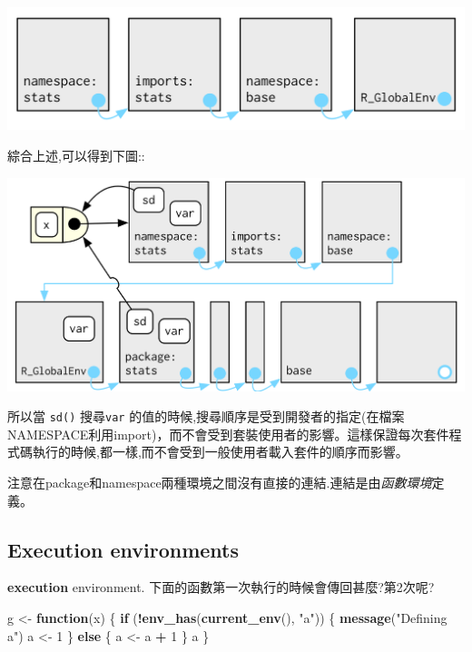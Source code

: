 \documentclass[]{book}
\newenvironment{Shaded}{\begin{snugshade}}{\end{snugshade}}
\newcommand{\ControlFlowTok}[1]{\textcolor[rgb]{0.13,0.29,0.53}{\textbf{#1}}}
\newcommand{\DecValTok}[1]{\textcolor[rgb]{0.00,0.00,0.81}{#1}}
\newcommand{\KeywordTok}[1]{\textcolor[rgb]{0.13,0.29,0.53}{\textbf{#1}}}
\newcommand{\NormalTok}[1]{#1}
\newcommand{\OperatorTok}[1]{\textcolor[rgb]{0.81,0.36,0.00}{\textbf{#1}}}
\newcommand{\StringTok}[1]{\textcolor[rgb]{0.31,0.60,0.02}{#1}}
\theoremstyle{definition}
\theoremstyle{definition}
\theoremstyle{definition}
\theoremstyle{remark}
\begin{document}
\begin{center}\includegraphics{diagrams/environments/namespace-env} \end{center}

綜合上述,可以得到下圖::

\begin{center}\includegraphics{diagrams/environments/namespace} \end{center}

所以當 \texttt{sd()} 搜尋\texttt{var}
的值的時候,搜尋順序是受到開發者的指定(在檔案NAMESPACE利用import)，而不會受到套裝使用者的影響。這樣保證每次套件程式碼執行的時候,都一樣,而不會受到一般使用者載入套件的順序而影響。

注意在package和namespace兩種環境之間沒有直接的連結.連結是由\emph{函數環境}定義。

\hypertarget{execution-environments}{%
\subsection{Execution environments}\label{execution-environments}}

\textbf{execution} environment.
下面的函數第一次執行的時候會傳回甚麼?第2次呢?

\begin{Shaded}
\begin{Highlighting}[]
\NormalTok{g <-}\StringTok{ }\ControlFlowTok{function}\NormalTok{(x) \{}
  \ControlFlowTok{if}\NormalTok{ (}\OperatorTok{!}\KeywordTok{env_has}\NormalTok{(}\KeywordTok{current_env}\NormalTok{(), }\StringTok{"a"}\NormalTok{)) \{}
    \KeywordTok{message}\NormalTok{(}\StringTok{"Defining a"}\NormalTok{)}
\NormalTok{    a <-}\StringTok{ }\DecValTok{1}
\NormalTok{  \} }\ControlFlowTok{else}\NormalTok{ \{}
\NormalTok{    a <-}\StringTok{ }\NormalTok{a }\OperatorTok{+}\StringTok{ }\DecValTok{1}
\NormalTok{  \}}
\NormalTok{  a}
\NormalTok{\}}
\end{Highlighting}
\end{Shaded}
\end{document}
